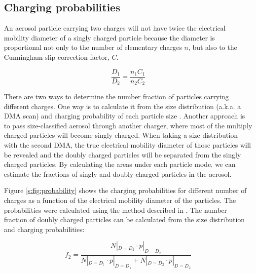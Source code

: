 \documentclass[12pt]{article}
\begin{document}
\subsection{Charging probabilities}
An aerosol particle carrying two charges will not have twice the electrical mobility diameter of a singly charged particle because the diameter is proportional not only to the number of elementary charges $n$, but also to the Cunningham slip correction factor, $C$.

\begin{equation}
    \frac{D_1}{D_2}=\frac{n_1C_1}{n_2C_2}
\end{equation}

\noindent There are two ways to determine the number fraction of particles carrying different charges. One way is to calculate it from the size distribution (a.k.a. a DMA scan) and charging probability of each particle size \citep{RN10}. Another approach is to pass size-classified aerosol through another charger, where most of the multiply charged particles will become singly charged. When taking a size distribution with the second DMA, the true electrical mobility diameter of those particles will be revealed and the doubly charged particles will be separated from the singly charged particles. By calculating the areas under each particle mode, we can estimate the fractions of singly and doubly charged particles in the aerosol.

Figure \ref{s:fig:probability} shows the charging probabilities for different number of charges as a function of the electrical mobility diameter of the particles. The probabilities were calculated using the method described in \citep{RN10}. The number fraction of doubly charged particles can be calculated from the size distribution and charging probabilities:

\begin{equation}
    f_2=\frac{N|_{D=D_2}\cdot p|_{D=D_2}}{N|_{D=D_1}\cdot p|_{D=D_1}+N|_{D=D_2}\cdot p|_{D=D_2}}
\end{equation}
\end{document}
